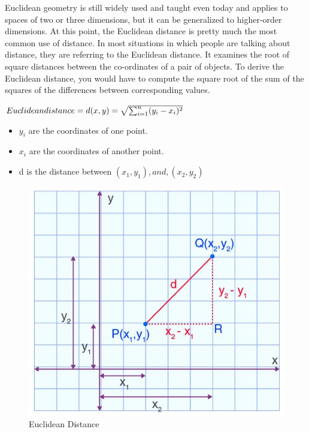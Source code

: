 \documentclass[conference]{IEEEtran}
\begin{document}
Euclidean geometry is still widely used and taught even today and applies to spaces of two or three dimensions, but it can be generalized to higher-order dimensions. At this point, the Euclidean distance is pretty much the most common use of distance. In most situations in which people are talking about distance, they are referring to the Euclidean distance. It examines the root of square distances between the co-ordinates of a pair of objects. To derive the Euclidean distance, you would have to compute the square root of the sum of the squares of the differences between corresponding values.





\begin{math}
Euclidean distance = d(x,y)=\sqrt{\sum_{i=1}^{n} (y_{i} - x_{i})^2}
\newline
\end{math}

\begin{itemize}
    \item \begin{math}
y_{i}
\end{math}
are the coordinates of one point.
\item \begin{math}
x_{i}
\end{math}
are the coordinates of another point.

\item 
d is the distance between
\begin{math}
(x_{1},y_{1}), and, (x_{2},y_{2})
\end{math}

\end{itemize}




\begin{figure}
    \centering
    \includegraphics[width=0.5\linewidth]{EDistance.jpg}
    \caption{Euclidean Distance}
    \label{fig:enter-label}
\end{figure}
\end{document}
